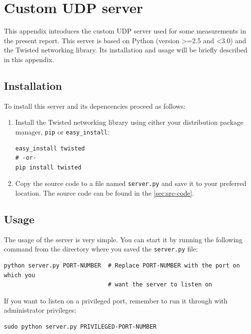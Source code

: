 \documentclass[10pt,a4paper,twoside,onecolumn]{article}
\begin{document}
\clearpage

\appendix
\section{Custom UDP server}
\label{sec:udp-server}

This appendix introduces the custom UDP server used for some measurements in the present report. This server is based on Python (version >=2.5 and <3.0) and the Twisted networking library. Its installation and usage will be briefly described in this appendix.

\subsection{Installation}

To install this server and its depencencies proceed as follows:

\begin{enumerate}
	\item Install the Twisted networking library using either your distribution package manager, \texttt{pip} or \texttt{easy\_install}:
	\lstset{caption=,label=,language=bash}
\begin{lstlisting}
easy_install twisted
# -or-
pip install twisted
\end{lstlisting}
	\item Copy the source code to a file named \texttt{server.py} and save it to your preferred location. The source code can be found in the \autoref{sec:src-code}.

\end{enumerate}

\subsection{Usage}

The usage of the server is very simple. You can start it by running the following command from the directory where you saved the \texttt{server.py} file:
\lstset{caption=,label=,language=bash}
\begin{lstlisting}
python server.py PORT-NUMBER  # Replace PORT-NUMBER with the port on which you
                              # want the server to listen on
\end{lstlisting}

If you want to listen on a privileged port, remember to run it through with administrator privileges:

\begin{lstlisting}
sudo python server.py PRIVILEGED-PORT-NUMBER
\end{lstlisting}
\end{document}
